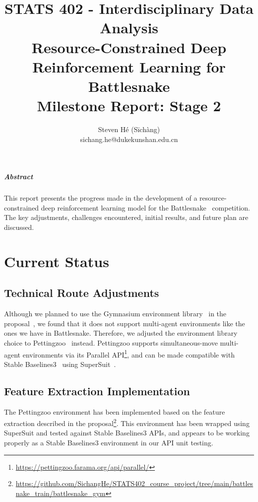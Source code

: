 \documentclass[a4paper]{article}
\title{STATS 402 - Interdisciplinary Data Analysis\\
    Resource-Constrained Deep Reinforcement Learning for Battlesnake\\
    Milestone Report: Stage 2
}
\author{Steven Hé (Sīchàng)\\
    sichang.he@dukekunshan.edu.cn
}
\newcommand{\todo}[1]{\textcolor{red}{[ #1 ]}}
\newcommand{\instruction}[1]{\textcolor{orange}{#1}}
\renewcommand{\todo}[1]{} %
\renewcommand{\instruction}[1]{} %
\begin{document}
\maketitle

\instruction{
    There are no specific requirements for the stage 2 report since the progress may vary among different groups. Generally, there are four parts you need to cover in your report.
}

\subparagraph{Abstract}

This report presents the progress made in the development of a
resource-constrained deep reinforcement learning model for the
Battlesnake~\cite{battlesnake} competition. The key adjustments,
challenges encountered, initial results, and future plan are discussed.

\section{Current Status}

\todo{The current status of your project.\\
    For example, the detailed techniques you adopted to conduct the project. Has your group made any technical route adjustments? This part is essential for the groups whose actual adopted method is different from their milestone report 1. You need to explain the reason for the change.
}

\subsection{Technical Route Adjustments}

Although we planned to use the Gymnasium environment
library~\cite{farama2024gymnasium} in the proposal~\cite{proposal},
we found that it does not support multi-agent environments like the ones we have
in Battlesnake. Therefore,
we adjusted the environment library choice to
Pettingzoo~\cite{terry2021pettingzoo} instead.
Pettingzoo supports simultaneous-move multi-agent environments via its Parallel
API\footnote{\url{https://pettingzoo.farama.org/api/parallel/}},
and can be made compatible with Stable Baselines3~\cite{raffin2024stable}
using SuperSuit~\cite{SuperSuit}.

\subsection{Feature Extraction Implementation}

The Pettingzoo environment has been implemented based on the feature extraction
described in the
proposal\footnote{\url{https://github.com/SichangHe/STATS402_course_project/tree/main/battlesnake_train/battlesnake_gym}}.
This environment has been wrapped using SuperSuit and tested against Stable
Baselines3 APIs,
and appears to be working properly as a Stable Baselines3 environment in our API
unit testing.
\end{document}
